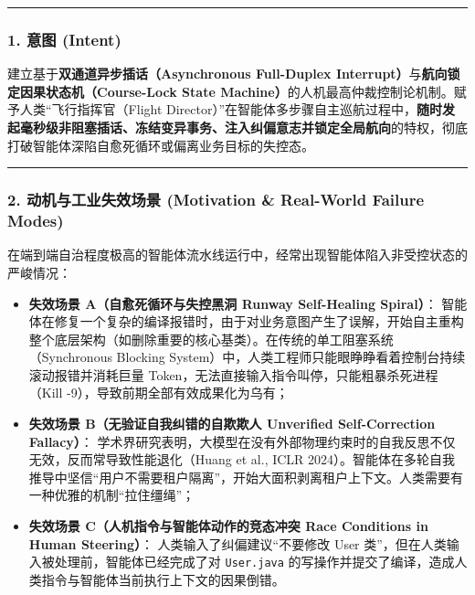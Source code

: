 \begin{center}\rule{0.5\linewidth}{0.5pt}\end{center}

\subsubsection{1. 意图 (Intent)}\label{ux610fux56fe-intent-16}

建立基于\textbf{双通道异步插话（Asynchronous Full-Duplex
Interrupt）}与\textbf{航向锁定因果状态机（Course-Lock State
Machine）}的人机最高仲裁控制论机制。赋予人类``飞行指挥官（Flight
Director）''在智能体多步骤自主巡航过程中，\textbf{随时发起毫秒级非阻塞插话、冻结变异事务、注入纠偏意志并锁定全局航向}的特权，彻底打破智能体深陷自愈死循环或偏离业务目标的失控态。

\begin{center}\rule{0.5\linewidth}{0.5pt}\end{center}

\subsubsection{2. 动机与工业失效场景 (Motivation \& Real-World Failure
Modes)}\label{ux52a8ux673aux4e0eux5de5ux4e1aux5931ux6548ux573aux666f-motivation-real-world-failure-modes-16}

在端到端自治程度极高的智能体流水线运行中，经常出现智能体陷入非受控状态的严峻情况：

\begin{itemize}
\tightlist
\item
  \textbf{失效场景 A（自愈死循环与失控黑洞 Runway Self-Healing
  Spiral）}：
  智能体在修复一个复杂的编译报错时，由于对业务意图产生了误解，开始自主重构整个底层架构（如删除重要的核心基类）。在传统的单工阻塞系统（Synchronous
  Blocking
  System）中，人类工程师只能眼睁睁看着控制台持续滚动报错并消耗巨量
  Token，无法直接输入指令叫停，只能粗暴杀死进程（Kill
  -9），导致前期全部有效成果化为乌有；
\item
  \textbf{失效场景 B（无验证自我纠错的自欺欺人 Unverified
  Self-Correction Fallacy）}：
  学术界研究表明，大模型在没有外部物理约束时的自我反思不仅无效，反而常导致性能退化（Huang
  et al., ICLR
  2024）。智能体在多轮自我推导中坚信``用户不需要租户隔离''，开始大面积剥离租户上下文。人类需要有一种优雅的机制``拉住缰绳''；
\item
  \textbf{失效场景 C（人机指令与智能体动作的竞态冲突 Race Conditions in
  Human Steering）}： 人类输入了纠偏建议``不要修改 User
  类''，但在人类输入被处理前，智能体已经完成了对 \texttt{User.java}
  的写操作并提交了编译，造成人类指令与智能体当前执行上下文的因果倒错。
\end{itemize}

